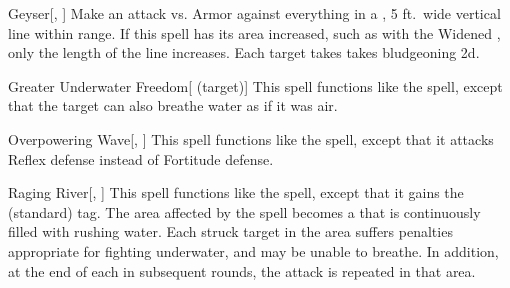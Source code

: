 \lowercase{\hypertarget{spell:Geyser}{}}\label{spell:Geyser}
\begin{apability}[\nth{2}]{\hypertarget{spell:Geyser}{Geyser}}[, ]
Make an attack vs. Armor against everything in a \arealarge, 5 ft.\ wide vertical line within \rngmed range.
If this spell has its area increased, such as with the Widened , only the length of the line increases.
\hit Each target takes takes bludgeoning  \plus2d.
\end{apability}
\vspace{0.25em}



\lowercase{\hypertarget{spell:Greater Underwater Freedom}{}}\label{spell:Greater Underwater Freedom}
\begin{attuneability}[\nth{3}]{\hypertarget{spell:Greater Underwater Freedom}{Greater Underwater Freedom}}[ (target)]
This spell functions like the  spell, except that the target can also breathe water as if it was air.
\end{attuneability}
\vspace{0.25em}



\lowercase{\hypertarget{spell:Overpowering Wave}{}}\label{spell:Overpowering Wave}
\begin{apability}[\nth{3}]{\hypertarget{spell:Overpowering Wave}{Overpowering Wave}}[, ]
This spell functions like the  spell, except that it attacks Reflex defense instead of Fortitude defense.
\end{apability}
\vspace{0.25em}



\lowercase{\hypertarget{spell:Raging River}{}}\label{spell:Raging River}
\begin{apability}[\nth{3}]{\hypertarget{spell:Raging River}{Raging River}}[, ]
This spell functions like the  spell, except that it gains the  (standard) tag.
The area affected by the spell becomes a  that is continuously filled with rushing water.
Each struck target in the area suffers penalties appropriate for fighting underwater, and may be unable to breathe.
In addition, at the end of each  in subsequent rounds, the attack is repeated in that area.
\end{apability}
\vspace{0.25em}




